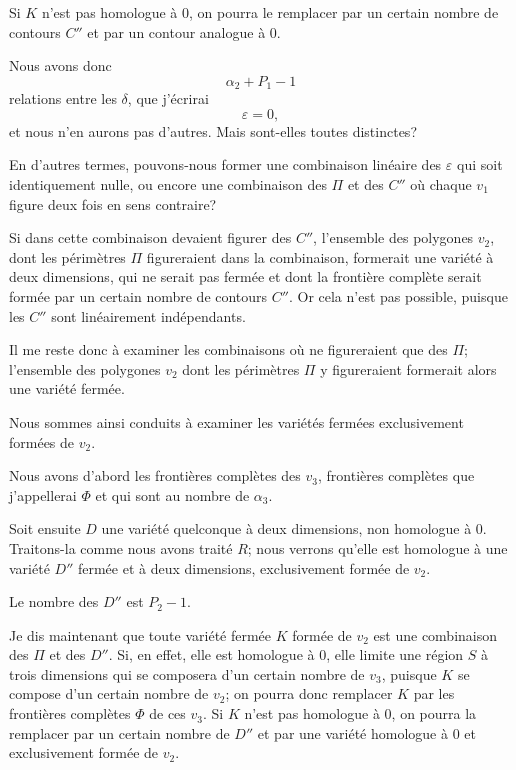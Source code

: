 \documentclass{article}
\begin{document}
Si $K$ n'est pas homologue à 0, on pourra le remplacer par un certain nombre de contours $C''$ et par un contour analogue à 0.

Nous avons donc
\[ \alpha_{2} + P_{1} - 1 \]
relations entre les $\delta$, que j'écrirai
\[ \varepsilon = 0, \]
et nous n'en aurons pas d'autres. Mais sont-elles toutes distinctes?

En d'autres termes, pouvons-nous former une combinaison linéaire des $\varepsilon$ qui soit identiquement nulle, ou encore une combinaison des $\Pi$ et des $C''$ où chaque $v_{1}$ figure deux fois en sens contraire?

Si dans cette combinaison devaient figurer des $C''$, l'ensemble des polygones $v_{2}$, dont les périmètres $\Pi$ figureraient dans la combinaison, formerait une variété à deux dimensions, qui ne serait pas fermée et dont la frontière complète serait formée par un certain nombre de contours $C''$. Or cela n'est pas possible, puisque les $C''$ sont linéairement indépendants.

Il me reste donc à examiner les combinaisons où ne figureraient que des $\Pi$; l'ensemble des polygones $v_{2}$ dont les périmètres $\Pi$ y figureraient formerait alors une variété fermée.

Nous sommes ainsi conduits à examiner les variétés fermées exclusivement formées de $v_{2}$.

Nous avons d'abord les frontières complètes des $v_{3}$, frontières complètes que j'appellerai $\Phi$ et qui sont au nombre de $\alpha_{3}$.

Soit ensuite $D$ une variété quelconque à deux dimensions, non homologue
à 0. Traitons-la comme nous avons traité $R$; nous verrons qu'elle est homologue à une variété $D''$ fermée et à deux dimensions, exclusivement formée de $v_{2}$.

Le nombre des $D''$ est $P_{2} - 1$.

Je dis maintenant que toute variété fermée $K$ formée de $v_{2}$ est une combinaison des $\Pi$ et des $D''$. Si, en effet, elle est homologue à 0, elle limite une région $S$ à trois dimensions qui se composera d'un certain nombre de $v_{3}$, puisque $K$ se compose d'un certain nombre de $v_{2}$; on pourra donc remplacer $K$ par les frontières complètes $\Phi$ de ces $v_{3}$. Si $K$ n'est pas homologue à 0, on pourra la remplacer par un certain nombre de $D''$ et par une variété homologue à 0 et exclusivement formée de $v_{2}$.
\end{document}
